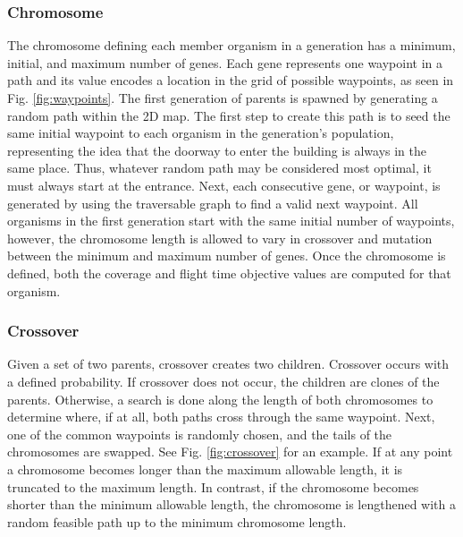 \documentclass[letterpaper, 10 pt, conference]{ieeeconf}  %
\begin{document}
\subsubsection{Chromosome}

The chromosome defining each member organism in a generation has a minimum, initial, and maximum number of genes. Each gene represents one waypoint in a path and its value encodes a location in the grid of possible waypoints, as seen in Fig. \ref{fig:waypoints}. The first generation of parents is spawned by generating a random path within the 2D map. The first step to create this path is to seed the same initial waypoint to each organism in the generation's population, representing the idea that the doorway to enter the building is always in the same place. Thus, whatever random path may be considered most optimal, it must always start at the entrance. Next, each consecutive gene, or waypoint, is generated by using the traversable graph to find a valid next waypoint. All organisms in the first generation start with the same initial number of waypoints, however, the chromosome length is allowed to vary in crossover and mutation between the minimum and maximum number of genes. Once the chromosome is defined, both the coverage and flight time objective values are computed for that organism.

\subsubsection{Crossover}

Given a set of two parents, crossover creates two children. Crossover occurs with a defined probability. If crossover does not occur, the children are clones of the parents. Otherwise, a search is done along the length of both chromosomes to determine where, if at all, both paths cross through the same waypoint. Next, one of the common waypoints is randomly chosen, and the tails of the chromosomes are swapped. See Fig. \ref{fig:crossover} for an example. If at any point a chromosome becomes longer than the maximum allowable length, it is truncated to the maximum length. In contrast, if the chromosome becomes shorter than the minimum allowable length, the chromosome is lengthened with a random feasible path up to the minimum chromosome length.
\end{document}
